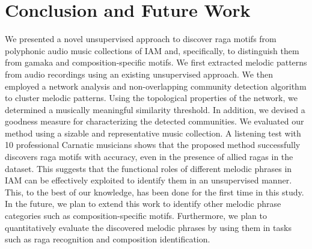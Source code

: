 \section{Conclusion and Future Work}
\label{sec:conclusion}

We presented a novel unsupervised approach to discover \gls{raga} motifs from polyphonic audio music collections of IAM and, specifically, to distinguish them from gamaka and composition-specific motifs. We first extracted melodic patterns from audio recordings using an existing unsupervised approach. We then employed a network analysis and non-overlapping community detection algorithm to cluster melodic patterns. Using the topological properties of the network, we determined a musically meaningful similarity threshold. In addition, we devised a goodness measure for characterizing the detected communities. We evaluated our method using a sizable and representative music collection. A listening test with 10 professional Carnatic musicians shows that the proposed method successfully discovers \gls{raga} motifs with accuracy, even in the presence of allied \glspl{raga} in the dataset. This suggests that the functional roles of different melodic phrases in IAM can be effectively exploited to identify them in an unsupervised manner. This, to the best of our knowledge, has been done for the first time in this study. In the future, we plan to extend this work to identify other melodic phrase categories such as composition-specific motifs. Furthermore, we plan to quantitatively evaluate the discovered melodic phrases by using them in tasks such as \gls{raga} recognition and composition identification.


